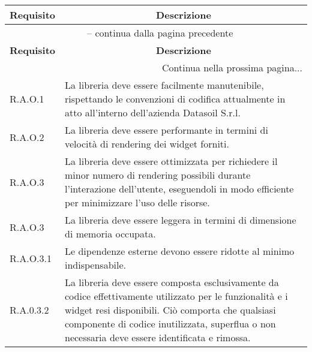 \begin{center}
    \begin{longtable}{|p{2.5cm}|p{10cm}|}
        \hline
        \rowcolor{gray!30}
        \textbf{Requisito} & \multicolumn{1}{c|}{\textbf{Descrizione}}                                                                                    \\
        \hline
        \endfirsthead
        \multicolumn{2}{c}{{\tablename\ \thetable{} -- continua dalla pagina precedente}}                                                                 \\
        \hline
        \rowcolor{gray!30}
        \textbf{Requisito} & \multicolumn{1}{c|}{\textbf{Descrizione}}                                                                                    \\
        \endhead
        \hline
        \multicolumn{2}{|r|}{{Continua nella prossima pagina...}}                                                                                         \\
        \hline
        \endfoot
        \hline
        \endlastfoot
        \hline
        R.A.O.1            & La libreria deve essere facilmente manutenibile, rispettando le convenzioni di codifica
        attualmente in atto all'interno dell'azienda Datasoil S.r.l.                                                                                      \\
        \hline
        R.A.O.2            & La libreria deve essere performante in termini di velocità di rendering dei widget forniti.                                  \\
        \hline
        R.A.O.3            & La libreria deve essere ottimizzata per richiedere il minor numero di rendering possibili durante l'interazione dell'utente,
        eseguendoli in modo efficiente per minimizzare l'uso delle risorse.                                                                               \\
        \hline
        R.A.O.3            & La libreria deve essere leggera in termini di dimensione di memoria occupata.                                                \\
        \hline
        R.A.O.3.1          & Le dipendenze esterne devono essere ridotte al minimo indispensabile.                                                        \\
        \hline
        R.A.0.3.2          & La libreria deve essere composta esclusivamente da codice effettivamente utilizzato per le funzionalità e i widget resi
        disponibili. Ciò comporta che qualsiasi componente di codice inutilizzata, superflua o non necessaria deve essere identificata e rimossa.         \\
    \end{longtable}
    \label{tab:requisiti_qualitativi}
\end{center}

